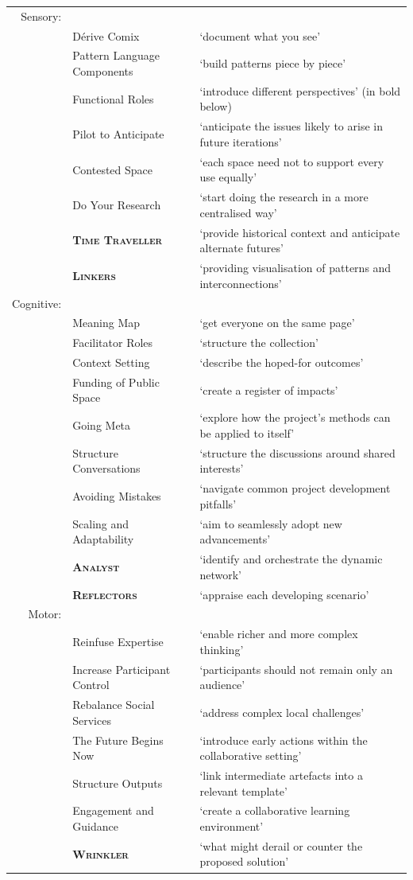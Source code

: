 \documentclass[acmlarge,timestamp]{acmart}
\begin{document}
\begin{table}
  \begin{tabular}{rll}
    Sensory: &\\
&  {\sc Dérive Comix}& ‘document what you see’ \\
&  {\sc Pattern Language Components }& ‘build patterns piece by piece’\\
&  {\sc Functional Roles}& ‘introduce different perspectives’ (in bold below)\\ 
&  {\sc Pilot to Anticipate}& ‘anticipate the issues likely to arise in future iterations’\\
&  {\sc Contested Space}& ‘each space need not to support every use equally’ \\
&  {\sc Do Your Research}& ‘start doing the research in a more centralised way’\\
&  {\bfseries\scshape Time Traveller }& ‘provide historical context and
anticipate alternate futures’\\
&  {\bfseries\scshape Linkers}& ‘providing visualisation of patterns and interconnections’ \\
Cognitive: && \\
&{\sc Meaning Map }& ‘get everyone on the same page’\\
&{\sc Facilitator Roles}& ‘structure the collection’\\
&{\sc Context Setting}& ‘describe the hoped-for outcomes’\\
&{\sc Funding of Public Space}& ‘create a register of impacts’\\
&{\sc Going Meta}& ‘explore how the project’s methods can be applied to
itself’\\
&{\sc Structure Conversations}& ‘structure the discussions around shared interests’\\
&{\sc Avoiding Mistakes}& ‘navigate common project development pitfalls’\\
&{\sc Scaling and Adaptability}& ‘aim to seamlessly adopt new advancements’\\
&{\bfseries\scshape Analyst }& ‘identify and orchestrate the dynamic network’ \\
&{\bfseries\scshape Reflectors}& ‘appraise each developing scenario’\\
Motor: && \\
&{\sc Reinfuse Expertise }& ‘enable richer and more complex thinking’\\
&{\sc Increase Participant Control}& ‘participants should not remain only an audience’\\
&{\sc Rebalance Social Services}& ‘address complex local challenges’\\
&{\sc The Future Begins Now}& ‘introduce early actions within the
collaborative setting’\\
&{\sc Structure Outputs}& ‘link intermediate artefacts into a relevant template’\\
&{\sc Engagement and Guidance}& ‘create a collaborative learning environment’\\
&{\bfseries\scshape Wrinkler }& ‘what might derail or counter
the proposed solution’\\


\end{tabular}
\end{table}
\end{document}
